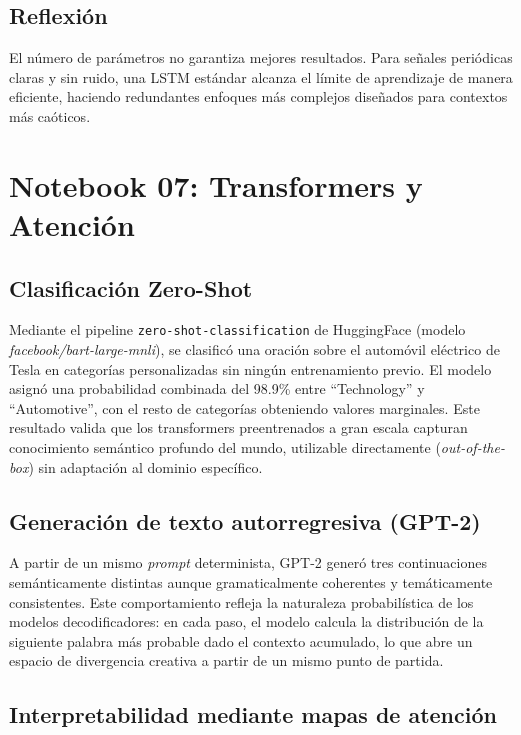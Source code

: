 \documentclass[12pt, a4paper]{article}
\begin{document}
\subsection{Reflexión}

El número de parámetros no garantiza mejores resultados. Para señales periódicas claras y sin ruido, una LSTM estándar alcanza el límite de aprendizaje de manera eficiente, haciendo redundantes enfoques más complejos diseñados para contextos más caóticos.

\section{Notebook 07: Transformers y Atención}

\subsection{Clasificación Zero-Shot}

Mediante el pipeline \texttt{zero-shot-classification} de HuggingFace (modelo \textit{facebook/bart-large-mnli}), se clasificó una oración sobre el automóvil eléctrico de Tesla en categorías personalizadas sin ningún entrenamiento previo. El modelo asignó una probabilidad combinada del 98.9\% entre ``Technology'' y ``Automotive'', con el resto de categorías obteniendo valores marginales. Este resultado valida que los transformers preentrenados a gran escala capturan conocimiento semántico profundo del mundo, utilizable directamente (\textit{out-of-the-box}) sin adaptación al dominio específico.

\subsection{Generación de texto autorregresiva (GPT-2)}

A partir de un mismo \textit{prompt} determinista, GPT-2 generó tres continuaciones semánticamente distintas aunque gramaticalmente coherentes y temáticamente consistentes. Este comportamiento refleja la naturaleza probabilística de los modelos decodificadores: en cada paso, el modelo calcula la distribución de la siguiente palabra más probable dado el contexto acumulado, lo que abre un espacio de divergencia creativa a partir de un mismo punto de partida.

\subsection{Interpretabilidad mediante mapas de atención}
\end{document}
